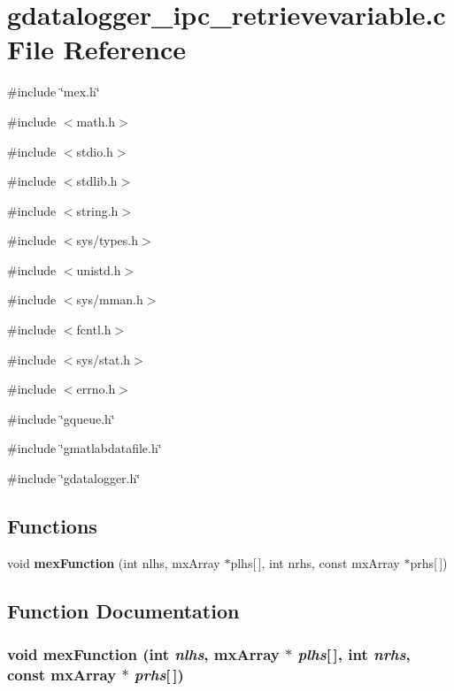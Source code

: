 \section{gdatalogger\_\-ipc\_\-retrievevariable.c File Reference}
\label{matlab_2gdatalogger__ipc__retrievevariable_8c}
{\ttfamily \#include \char`\"{}mex.h\char`\"{}}\par
{\ttfamily \#include $<$math.h$>$}\par
{\ttfamily \#include $<$stdio.h$>$}\par
{\ttfamily \#include $<$stdlib.h$>$}\par
{\ttfamily \#include $<$string.h$>$}\par
{\ttfamily \#include $<$sys/types.h$>$}\par
{\ttfamily \#include $<$unistd.h$>$}\par
{\ttfamily \#include $<$sys/mman.h$>$}\par
{\ttfamily \#include $<$fcntl.h$>$}\par
{\ttfamily \#include $<$sys/stat.h$>$}\par
{\ttfamily \#include $<$errno.h$>$}\par
{\ttfamily \#include \char`\"{}gqueue.h\char`\"{}}\par
{\ttfamily \#include \char`\"{}gmatlabdatafile.h\char`\"{}}\par
{\ttfamily \#include \char`\"{}gdatalogger.h\char`\"{}}\par
\subsection*{Functions}
\begin{DoxyCompactItemize}
\item 
void {\bf mexFunction} (int nlhs, mxArray $\ast$plhs[$\,$], int nrhs, const mxArray $\ast$prhs[$\,$])
\end{DoxyCompactItemize}


\subsection{Function Documentation}
\subsubsection[{mexFunction}]{\setlength{\rightskip}{0pt plus 5cm}void mexFunction (int {\em nlhs}, \/  mxArray $\ast$ {\em plhs}[$\,$], \/  int {\em nrhs}, \/  const mxArray $\ast$ {\em prhs}[$\,$])}\label{matlab_2gdatalogger__ipc__retrievevariable_8c_a6a215cbfde54f82a3ce599228fc3fce5}


